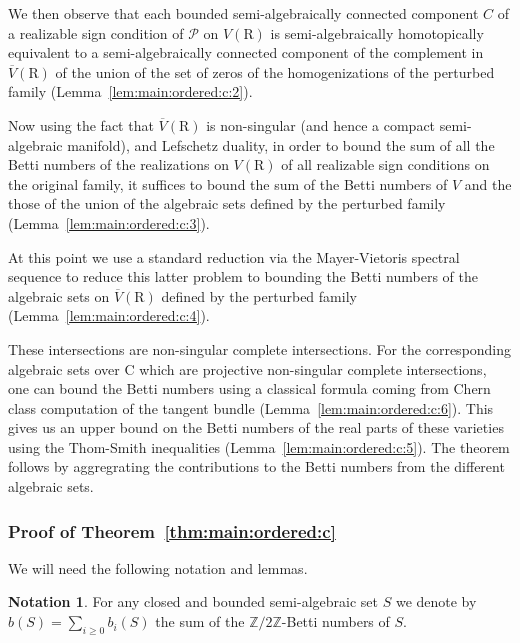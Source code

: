 \documentclass[10pt]{amsart}
\theoremstyle{definition}
\newtheorem{notation}{Notation}[section]
\theoremstyle{remark}
\numberwithin{equation}{section}
\newcommand {\R} {\mathrm{R}}
\newcommand {\C}     {\mathrm{C}}
\newcommand {\Z}  {\mathbb{Z}}
\begin{document}
We then observe that each bounded semi-algebraically connected component $C$ of a realizable sign condition of $\mathcal{P}$ on $V(\R)$ is semi-algebraically homotopically equivalent to 
a semi-algebraically connected component of the complement in
$\overline{V}(\R)$ of the union of the set of zeros of the homogenizations of the perturbed family (Lemma~\ref{lem:main:ordered:c:2}).

Now using the fact that $\overline{V}(\R)$ is non-singular (and hence a compact semi-algebraic manifold), and 
Lefschetz duality, 
in order to bound the sum of all the Betti numbers of 
the realizations on $V(\R)$ of all realizable sign conditions on the original family, it suffices to bound the sum of the Betti numbers of 
$V$ and the those of the union of the algebraic sets defined by the perturbed family (Lemma~\ref{lem:main:ordered:c:3}). 

At this point we use a standard reduction via the Mayer-Vietoris spectral sequence to reduce this latter problem to bounding the Betti numbers of 
the algebraic sets on $\overline{V}(\R)$ defined by the perturbed family
(Lemma~\ref{lem:main:ordered:c:4}).

These intersections are non-singular complete intersections. For the corresponding algebraic sets over $\C$ which are projective non-singular complete intersections, one can bound the Betti numbers using a classical formula coming from Chern class computation of the tangent bundle (Lemma~\ref{lem:main:ordered:c:6}). This gives us an upper bound on the Betti numbers of the real parts of these varieties using the Thom-Smith inequalities (Lemma~\ref{lem:main:ordered:c:5}). The theorem follows by aggregrating the contributions to the Betti numbers from the different algebraic sets. 

\subsubsection{Proof of Theorem~\ref{thm:main:ordered:c}}
We will need the following notation and lemmas.

\begin{notation}
    For any closed and bounded semi-algebraic set $S$ we denote by
    $b(S) = \sum_{i \geq 0} b_i(S)$ the sum of the $\Z/2\Z$-Betti numbers of $S$.
\end{notation}
\end{document}
